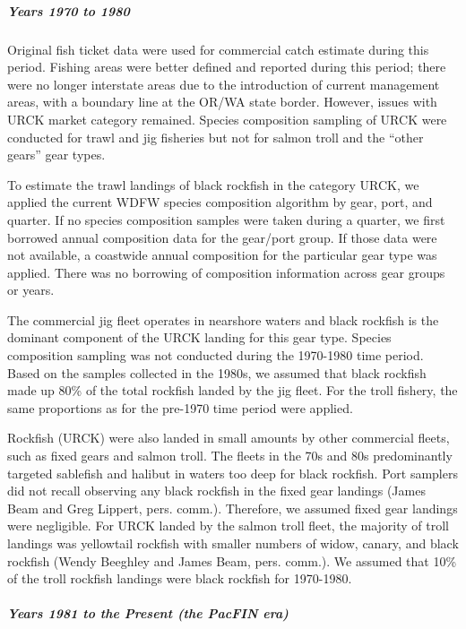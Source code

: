 \documentclass[11pt,
  english,
  letterpaper,
]{article}
\begin{document}
\hypertarget{years-1970-to-1980}{%
\subparagraph{Years 1970 to 1980}\label{years-1970-to-1980}}

Original fish ticket data were used for commercial catch estimate during this period. Fishing areas were better defined and reported during this period; there were no longer interstate areas due to the introduction of current management areas, with a boundary line at the OR/WA state border. However, issues with URCK market category remained. Species composition sampling of URCK were conducted for trawl and jig fisheries but not for salmon troll and the ``other gears'' gear types.

To estimate the trawl landings of black rockfish in the category URCK, we applied the current WDFW species composition algorithm by gear, port, and quarter. If no species composition samples were taken during a quarter, we first borrowed annual composition data for the gear/port group. If those data were not available, a coastwide annual composition for the particular gear type was applied. There was no borrowing of composition information across gear groups or years.

The commercial jig fleet operates in nearshore waters and black rockfish is the dominant component of the URCK landing for this gear type. Species composition sampling was not conducted during the 1970-1980 time period. Based on the samples collected in the 1980s, we assumed that black rockfish made up 80\% of the total rockfish landed by the jig fleet. For the troll fishery, the same proportions as for the pre-1970 time period were applied.

Rockfish (URCK) were also landed in small amounts by other commercial fleets, such as fixed gears and salmon troll. The fleets in the 70s and 80s predominantly targeted sablefish and halibut in waters too deep for black rockfish. Port samplers did not recall observing any black rockfish in the fixed gear landings (James Beam and Greg Lippert, pers. comm.). Therefore, we assumed fixed gear landings were negligible. For URCK landed by the salmon troll fleet, the majority of troll landings was yellowtail rockfish with smaller numbers of widow, canary, and black rockfish (Wendy Beeghley and James Beam, pers. comm.). We assumed that 10\% of the troll rockfish landings were black rockfish for 1970-1980.

\hypertarget{years-1981-to-the-present-the-pacfin-era}{%
\subparagraph{Years 1981 to the Present (the PacFIN era)}\label{years-1981-to-the-present-the-pacfin-era}}
\end{document}
